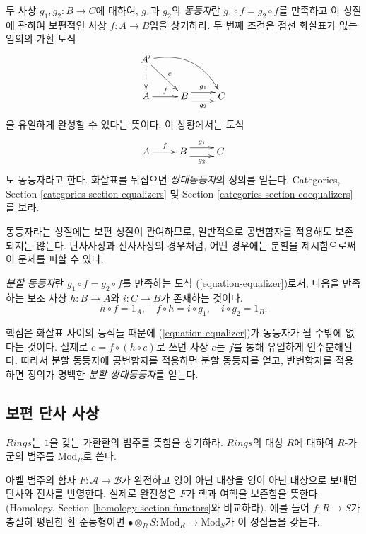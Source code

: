 \medskip\noindent
두 사상 $g_1, g_2: B \to C$에 대하여, $g_1$과 $g_2$의
{\it 동등자}란 $g_1 \circ f = g_2 \circ f$를 만족하고 이 성질에 관하여
보편적인 사상 $f: A \to B$임을 상기하라. 두 번째 조건은 점선 화살표가
없는 임의의 가환 도식
$$
\xymatrix{A' \ar[rd]^e \ar@/^1.5pc/[rrd] \ar@{-->}[d] & & \\
A \ar[r]^f & B \ar@<1ex>[r]^{g_1} \ar@<-1ex>[r]_{g_2} & 
C
}
$$
을 유일하게 완성할 수 있다는 뜻이다. 이 상황에서는 도식
\begin{equation}
\label{equation-equalizer}
\xymatrix{
A \ar[r]^f  & B \ar@<1ex>[r]^{g_1} \ar@<-1ex>[r]_{g_2} & C
}
\end{equation}
도 동등자라고 한다. 화살표를 뒤집으면 {\it 쌍대동등자}의 정의를 얻는다.
Categories, Section \ref{categories-section-equalizers} 및 Section
\ref{categories-section-coequalizers}를 보라.

\medskip\noindent
동등자라는 성질에는 보편 성질이 관여하므로, 일반적으로 공변함자를 적용해도
보존되지는 않는다. 단사사상과 전사사상의 경우처럼, 어떤 경우에는 분할을
제시함으로써 이 문제를 피할 수 있다.

\begin{definition}
\label{definition-split-equalizer}
{\it 분할 동등자}란 $g_1 \circ f = g_2 \circ f$를 만족하는 도식
(\ref{equation-equalizer})로서, 다음을 만족하는 보조 사상
$h : B \to A$와 $i : C \to B$가 존재하는 것이다.
\begin{equation}
\label{equation-split-equalizer-conditions}
h \circ f = 1_A, \quad f \circ h = i \circ g_1, \quad i \circ g_2 = 1_B.
\end{equation}
\end{definition}

\noindent
핵심은 화살표 사이의 등식들 때문에 (\ref{equation-equalizer})가 동등자가
될 수밖에 없다는 것이다. 실제로 $e = f \circ (h \circ e)$로 쓰면 사상
$e$는 $f$를 통해 유일하게 인수분해된다. 따라서 분할 동등자에 공변함자를
적용하면 분할 동등자를 얻고, 반변함자를 적용하면 정의가 명백한
{\it 분할 쌍대동등자}를 얻는다.

\subsection{보편 단사 사상}
\label{subsection-universally-injective}

\noindent
$\textit{Rings}$는 $1$을 갖는 가환환의 범주를 뜻함을 상기하라.
$\textit{Rings}$의 대상 $R$에 대하여 $R$-가군의 범주를
$\text{Mod}_R$로 쓴다.

\begin{remark}
\label{remark-reflects}
아벨 범주의 함자 $F : \mathcal{A} \to \mathcal{B}$가 완전하고 영이 아닌
대상을 영이 아닌 대상으로 보내면 단사와 전사를 반영한다. 실제로 완전성은
$F$가 핵과 여핵을 보존함을 뜻한다(Homology, Section
\ref{homology-section-functors}와 비교하라). 예를 들어
$f : R \to S$가 충실히 평탄한 환 준동형이면
$\bullet \otimes_R S: \text{Mod}_R \to \text{Mod}_S$가 이 성질들을 갖는다.
\end{remark}

